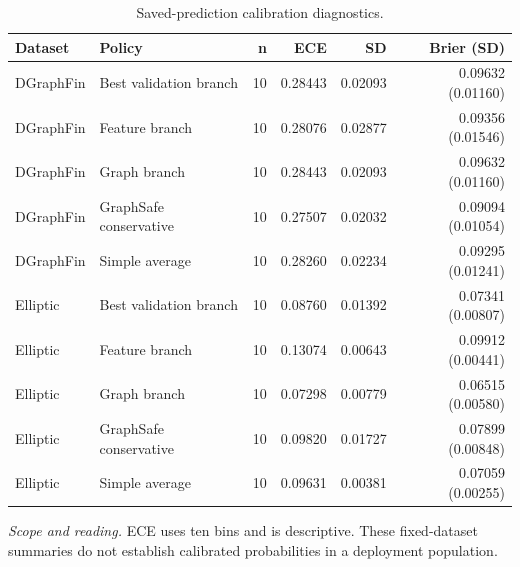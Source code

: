 \begin{table}[tbp]
\centering
\footnotesize
\setlength{\tabcolsep}{3.2pt}
\renewcommand{\arraystretch}{1.12}
\caption{Saved-prediction calibration diagnostics.}
\label{tab:s-calibration}
\begin{tabularx}{\textwidth}{@{}>{\raggedright\arraybackslash}p{} Y r r r r@{}}
\toprule
\textbf{Dataset} & \textbf{Policy} & \textbf{n} & \textbf{ECE} & \textbf{SD} & \textbf{Brier (SD)} \\
\midrule
DGraphFin & Best validation branch & 10 & 0.28443 & 0.02093 & 0.09632 (0.01160) \\
DGraphFin & Feature branch & 10 & 0.28076 & 0.02877 & 0.09356 (0.01546) \\
DGraphFin & Graph branch & 10 & 0.28443 & 0.02093 & 0.09632 (0.01160) \\
DGraphFin & GraphSafe conservative & 10 & 0.27507 & 0.02032 & 0.09094 (0.01054) \\
DGraphFin & Simple average & 10 & 0.28260 & 0.02234 & 0.09295 (0.01241) \\
Elliptic & Best validation branch & 10 & 0.08760 & 0.01392 & 0.07341 (0.00807) \\
Elliptic & Feature branch & 10 & 0.13074 & 0.00643 & 0.09912 (0.00441) \\
Elliptic & Graph branch & 10 & 0.07298 & 0.00779 & 0.06515 (0.00580) \\
Elliptic & GraphSafe conservative & 10 & 0.09820 & 0.01727 & 0.07899 (0.00848) \\
Elliptic & Simple average & 10 & 0.09631 & 0.00381 & 0.07059 (0.00255) \\
\bottomrule
\end{tabularx}
\vspace{2pt}
\begin{minipage}{\textwidth}\footnotesize\emph{Scope and reading.} ECE uses ten bins and is descriptive. These fixed-dataset summaries do not establish calibrated probabilities in a deployment population.\end{minipage}
\end{table}
